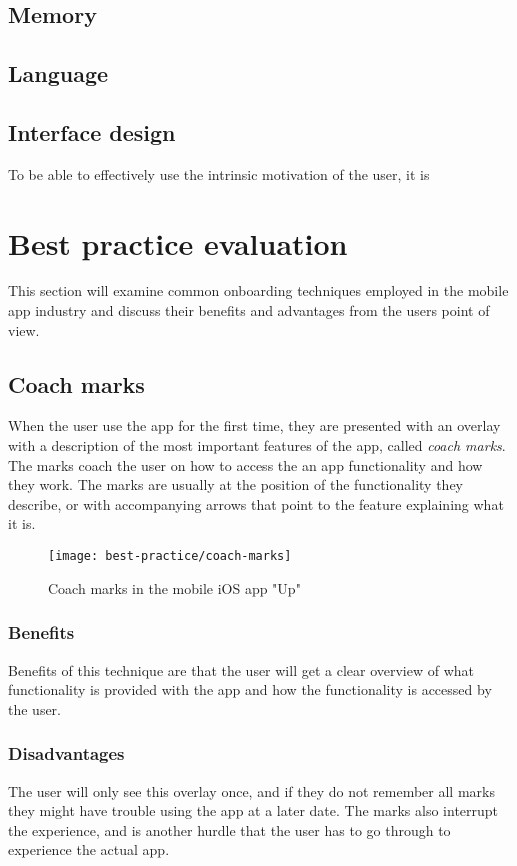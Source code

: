 {\subsection{Memory}
\subsection{Language}
\subsection{Interface design}
To be able to effectively use the intrinsic motivation of the user, it is
}

\section{Best practice evaluation}
\label{sec:best_practice_evaluation}

This section will examine common onboarding techniques employed in the mobile app industry and discuss their benefits and advantages from the users point of view.

\subsection{Coach marks}

When the user use the app for the first time, they are presented with an overlay with a description of the most important features of the app, called \textit{coach marks}. The marks coach the user on how to access the an app functionality and how they work. The marks are usually at the position of the functionality they describe, or with accompanying arrows that point to the feature explaining what it is.

\begin{figure}[h]
  \centering
    \texttt{[image: best-practice/coach-marks]}
  \caption{Coach marks in the mobile iOS app "Up"}
  \label{fig:best-practice/coach-marks}
\end{figure}

\subsubsection{Benefits}
Benefits of this technique are that the user will get a clear overview of what functionality is provided with the app and how the functionality is accessed by the user.
\subsubsection{Disadvantages}
The user will only see this overlay once, and if they do not remember all marks they might have trouble using the app at a later date. The marks also interrupt the experience, and is another hurdle that the user has to go through to experience the actual app.

